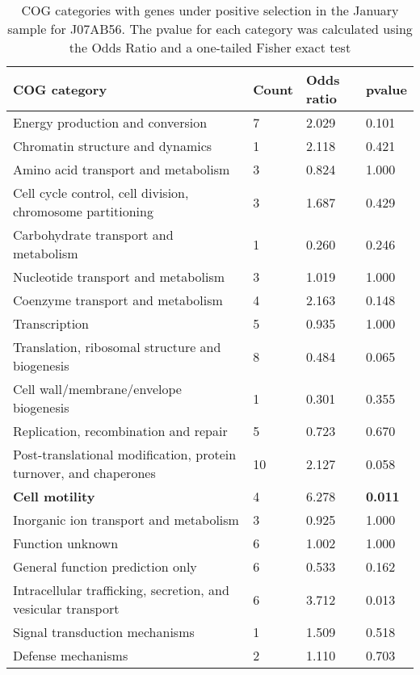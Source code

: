\begin{table}[]
\footnotesize 
	\tabcolsep=0.11cm 
\caption{COG categories with genes under positive selection in the January sample for J07AB56. The pvalue for each category was calculated using the Odds Ratio and a one-tailed Fisher exact test \\} 
\begin{tabularx}{\textwidth}{L{6cm}R{2cm}R{2cm}R{2cm}} 
\hline 
\textbf{COG category} & \textbf{Count} & \textbf{Odds ratio} & \textbf{pvalue} \\ 
\hline 
Energy production and conversion & 7 & 2.029 & 0.101 \\ 
Chromatin structure and dynamics & 1 & 2.118 & 0.421 \\ 
Amino acid transport and metabolism & 3 & 0.824 & 1.000 \\ 
Cell cycle control, cell division, chromosome partitioning & 3 & 1.687 & 0.429 \\ 
Carbohydrate transport and metabolism & 1 & 0.260 & 0.246 \\ 
Nucleotide transport and metabolism & 3 & 1.019 & 1.000 \\ 
Coenzyme transport and metabolism & 4 & 2.163 & 0.148 \\ 
Transcription & 5 & 0.935 & 1.000 \\ 
Translation, ribosomal structure and biogenesis & 8 & 0.484 & 0.065 \\ 
Cell wall/membrane/envelope biogenesis & 1 & 0.301 & 0.355 \\ 
Replication, recombination and repair & 5 & 0.723 & 0.670 \\ 
Post-translational modification, protein turnover, and chaperones & 10 & 2.127 & 0.058 \\ 
\textbf{Cell motility} & 4 & 6.278 & \textbf{0.011} \\ 
Inorganic ion transport and metabolism & 3 & 0.925 & 1.000 \\ 
Function unknown & 6 & 1.002 & 1.000 \\ 
General function prediction only & 6 & 0.533 & 0.162 \\ 
Intracellular trafficking, secretion, and vesicular transport & 6 & 3.712 & 0.013 \\ 
Signal transduction mechanisms & 1 & 1.509 & 0.518 \\ 
Defense mechanisms & 2 & 1.110 & 0.703 \\ 
\end{tabularx} 
\label{January_COG_Selection_J07AB56} 
 \end{table} 

